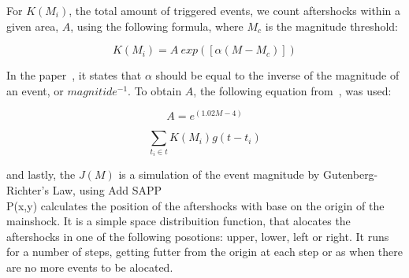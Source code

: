 For $K(M_i)$, the total amount of triggered events, we count
aftershocks within a given area, $A$, using the following formula,
where $M_c$ is the magnitude threshold:

\begin{equation}\label{triggered}
 K(M_i) = A\ exp([\alpha(M-M_c)])
\end{equation}

In the paper~\cite{ogata2006space}, it states that $\alpha$ should be
equal to the inverse of the magnitude of an event, or
$magnitide^{-1}$. To obtain $A$, the following equation
from~\cite{yamanaka1990scaling}, was used:

\begin{equation}
A = e^{(1.02M -4)}
\end{equation}


\begin{equation}
\displaystyle\sum_{t_i \in t} K(M_i)g(t-t_i)
\end{equation}

and lastly, the $J(M)$ is a simulation of the event magnitude by
Gutenberg-Richter's Law, using Add SAPP\\
%

P(x,y) calculates the position of the aftershocks with base on the origin of the mainshock. It is a simple space distribuition function, that alocates the aftershocks in one of the following posotions: upper, lower, left or right. It runs for a number of steps, getting futter from the origin at each step or as when there are no more events to be alocated.\\

